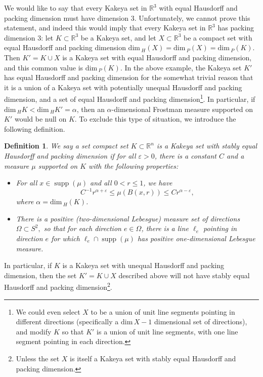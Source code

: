 \documentclass[letterpaper, reqno,11pt]{article}
\numberwithin{equation}{section}
\renewcommand{\dim}{\mathrm{dim}\,}
\newcommand{\RR}{\mathbb{R}}
\newcommand{\eps}{\varepsilon}
\newcommand{\supp}{\operatorname{supp}}
\numberwithin{thm}{section}
\newtheorem{defn}[thm]{Definition}
\theoremstyle{remark}
\begin{document}
We would like to say that every Kakeya set in $\RR^3$ with equal Hausdorff and packing dimension must have dimension 3. Unfortunately, we cannot prove this statement, and indeed this would imply that every Kakeya set in $\RR^3$ has packing dimension 3: let $K\subset\RR^3$ be a Kakeya set, and let $X\subset\RR^3$ be a compact set with equal Hausdorff and packing dimension $\dim_{\!H}(X) = \dim_{\!P}(X) = \dim_{\!P}(K)$. Then $K'=K\cup X$ is a Kakeya set with equal Hausdorff and packing dimension, and this common value is $\dim_{\!P}(K)$. In the above example, the Kakeya set $K'$ has equal Hausdorff and packing dimension for the somewhat trivial reason that it is a union of a Kakeya set with potentially unequal Hausdorff and packing dimension, and a set of equal Hausdorff and packing dimension\footnote{We could even select $X$ to be a union of unit line segments pointing in different directions (specifically a $\dim X - 1$ dimensional set of directions), and modify $K$ so that $K'$ is a union of unit line segments, with one line segment pointing in each direction.}. In particular, if $\dim_{\!H} K < \dim_{\!H} K'=\alpha$, then an $\alpha$-dimensional Frostman measure supported on $K'$ would be null on $K$. To exclude this type of situation, we introduce the following definition.


\begin{defn}\label{essentiallyEqualHausdorffPacking}
We say a set compact set $K\subset\RR^n$ is a \emph{Kakeya set with stably equal Hausdorff and packing dimension} if for all $\eps>0$, there is a constant $C$ and a measure $\mu$ supported on $K$ with the following properties:
\begin{itemize}
	\item For all $x\in\operatorname{supp}(\mu)$ and all $0<r\leq 1$, we have
	\[
		C^{-1} r^{\alpha+\eps}\leq \mu(B(x,r))\leq C r^{\alpha-\eps},
	\]
	where $\alpha=\dim_{\!H}(K)$.

	\item There is a positive (two-dimensional Lebesgue) measure set of directions $\Omega\subset S^2,$ so that for each direction $e\in\Omega$, there is a line $\ell_e$ pointing in direction $e$ for which $\ell_e\cap \supp(\mu)$ has positive one-dimensional Lebesgue measure.
	\end{itemize}
\end{defn}

In particular, if $K$ is a Kakeya set with unequal Hausdorff and packing dimension, then the set $K'=K\cup X$ described above will not have stably equal Hausdorff and packing dimension\footnote{Unless the set $X$ is itself a Kakeya set with stably equal Hausdorff and packing dimension.}.
\end{document}
